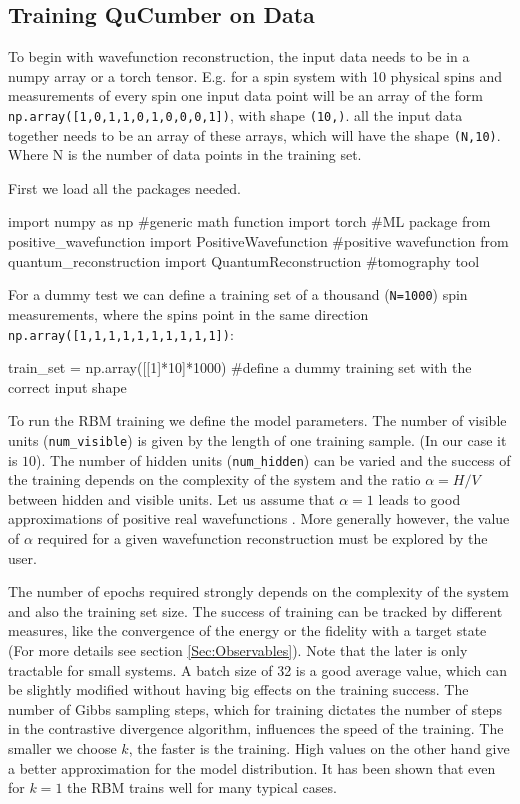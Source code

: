 \documentclass[submission, Phys]{SciPost}
\begin{document}
\subsection{Training QuCumber on Data}

To begin with wavefunction reconstruction, the input data needs to be in a numpy array or a torch tensor. E.g. for a spin system with 10 physical spins and measurements of every spin one input data point will be an array of the form \verb|np.array([1,0,1,1,0,1,0,0,0,1])|, with shape \verb|(10,)|. all the input data together needs to be an array of these arrays, which will have the shape \verb|(N,10)|. Where N is the number of data points in the training set.

First we load all the packages needed. 
\begin{python}
import numpy as np 		#generic math function
import torch 			#ML package
from positive_wavefunction import PositiveWavefunction #positive wavefunction
from quantum_reconstruction import QuantumReconstruction #tomography tool
\end{python} 

For a dummy test we can define a training set of a thousand (\verb|N=1000|) spin measurements, where the spins point in the same direction \verb|np.array([1,1,1,1,1,1,1,1,1,1])|:

\begin{python}
train_set = np.array([[1]*10]*1000) #define a dummy training set with the correct input shape
\end{python}

To run the RBM training we define the model parameters. The number of visible units (\verb|num_visible|) is given by the length of one training sample. (In our case it is $10$). 
The number of hidden units (\verb|num_hidden|) can be varied and the success of the training depends on the complexity of the system and the ratio $\alpha = H/V$ between hidden and visible units. Let us assume that $\alpha = 1$ leads to good approximations of positive real wavefunctions \cite{Torlai2016thermo}.  More generally however, the value of $\alpha$ required for a given wavefunction reconstruction must be explored by the user.

The number of epochs required strongly depends on the complexity of the system and also the training set size. The success of training can be tracked by different measures, like the convergence of the energy or the fidelity with a target state (For more details see section \ref{Sec:Observables}). Note that the later is only tractable for small systems. A batch size of 32 is a good average value, which can be slightly modified without having big effects on the training success. The number of Gibbs sampling steps,
which for training dictates the number of steps in the contrastive divergence algorithm, 
influences the speed of the training. The smaller we choose $k$, the faster is the training. High values on the other hand give a better approximation for the model distribution. It has been shown that even for $k=1$ the RBM trains well for many typical cases\cite{hinton2002training}.
\end{document}
